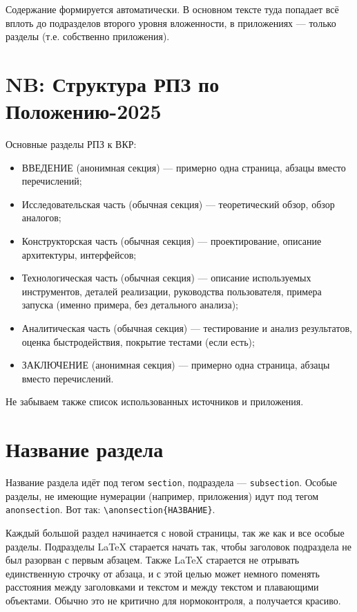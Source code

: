 \documentclass[14pt, russian]{scrartcl}
\begin{document}
Содержание формируется автоматически. В основном тексте туда попадает всё вплоть до подразделов второго уровня вложенности, в приложениях --- только разделы (т.е. собственно приложения).

\section{NB: Структура РПЗ по Положению-2025}

Основные разделы РПЗ к ВКР:
\begin{itemize}
\item ВВЕДЕНИЕ (анонимная секция) --- примерно одна страница, абзацы вместо перечислений;
\item Исследовательская часть (обычная секция) --- теоретический обзор, обзор аналогов;
\item Конструкторская часть (обычная секция) --- проектирование, описание архитектуры, интерфейсов;
\item Технологическая часть (обычная секция) --- описание используемых инструментов, деталей реализации, руководства пользователя, примера запуска (именно примера, без детального анализа);
\item Аналитическая часть (обычная секция) --- тестирование и анализ результатов, оценка быстродействия, покрытие тестами (если есть);
\item ЗАКЛЮЧЕНИЕ (анонимная секция) --- примерно одна страница, абзацы вместо перечислений.
\end{itemize}

Не забываем также список использованных источников и приложения.

\section{Название раздела}

Название раздела идёт под тегом \texttt{section}, подраздела --- \texttt{subsection}. Особые разделы, не имеющие нумерации (например, приложения) идут под тегом \texttt{anonsection}. Вот так: \texttt{\textbackslash anonsection\{НАЗВАНИЕ\}}.

Каждый большой раздел начинается с новой страницы, так же как и все особые разделы. Подразделы \LaTeX{} старается начать так, чтобы заголовок подраздела не был разорван с первым абзацем. Также \LaTeX{} старается не отрывать единственную строчку от абзаца, и с этой целью может немного поменять расстояния между заголовками и текстом и между текстом и плавающими объектами. Обычно это не критично для нормоконтроля, а получается красиво.
\end{document}
